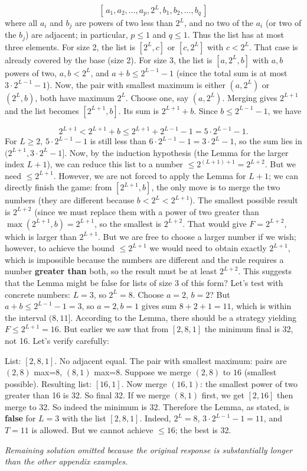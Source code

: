 \[
    [\, a_1, a_2, \dots, a_p, 2^{L}, b_1, b_2, \dots, b_q \,]
    \]
where all \(a_i\) and \(b_j\) are powers of two less than \(2^{L}\), and no two of the \(a_i\) (or two of the \(b_j\)) are adjacent; in particular, \(p \le 1\) and \(q \le 1\). Thus the list has at most three elements. For size 2, the list is \([2^{L}, c]\) or \([c, 2^{L}]\) with \(c < 2^{L}\). That case is already covered by the base (size 2). For size 3, the list is \([a, 2^{L}, b]\) with \(a,b\) powers of two, \(a,b < 2^{L}\), and \(a+b \le 2^{L-1} - 1\) (since the total sum is at most \(3 \cdot 2^{L-1} - 1\)). Now, the pair with smallest maximum is either \((a,2^{L})\) or \((2^{L},b)\), both have maximum \(2^{L}\). Choose one, say \((a,2^{L})\). Merging gives \(2^{L+1}\) and the list becomes \([2^{L+1}, b]\). Its sum is \(2^{L+1} + b\). Since \(b \le 2^{L-1} - 1\), we have\par
\[
    2^{L+1} < 2^{L+1} + b \le 2^{L+1} + 2^{L-1} - 1 = 5 \cdot 2^{L-1} - 1.
    \]
For \(L \ge 2\), \(5 \cdot 2^{L-1} - 1\) is still less than \(6 \cdot 2^{L-1} - 1 = 3 \cdot 2^{L} - 1\), so the sum lies in \((2^{L+1}, 3 \cdot 2^{L} - 1]\). Now, by the induction hypothesis (the Lemma for the larger index \(L+1\)), we can reduce this list to a number \(\le 2^{(L+1)+1} = 2^{L+2}\). But we need \(\le 2^{L+1}\). However, we are not forced to apply the Lemma for \(L+1\); we can directly finish the game: from \([2^{L+1}, b]\), the only move is to merge the two numbers (they are different because \(b < 2^{L} < 2^{L+1}\)). The smallest possible result is \(2^{L+2}\) (since we must replace them with a power of two greater than \(\max(2^{L+1}, b) = 2^{L+1}\), so the smallest is \(2^{L+2}\). That would give \(F = 2^{L+2}\), which is larger than \(2^{L+1}\). But we are free to choose a larger number if we wish; however, to achieve the bound \(\le 2^{L+1}\) we would need to obtain exactly \(2^{L+1}\), which is impossible because the numbers are different and the rule requires a number \textbf{greater than} both, so the result must be at least \(2^{L+2}\). This suggests that the Lemma might be false for lists of size 3 of this form? Let's test with concrete numbers: \(L=3\), so \(2^{L}=8\). Choose \(a=2\), \(b=2\)? But \(a+b \le 2^{L-1} - 1 = 3\), so \(a=2,b=1\) gives sum \(8+2+1=11\), which is within the interval \((8, 11]\). According to the Lemma, there should be a strategy yielding \(F \le 2^{L+1}=16\). But earlier we saw that from \([2,8,1]\) the minimum final is 32, not 16. Let's verify carefully:\par
List: \([2,8,1]\). No adjacent equal. The pair with smallest maximum: pairs are \((2,8)\) max=8, \((8,1)\) max=8. Suppose we merge \((2,8)\) to \(16\) (smallest possible). Resulting list: \([16,1]\). Now merge \((16,1)\): the smallest power of two greater than 16 is 32. So final 32. If we merge \((8,1)\) first, we get \([2,16]\) then merge to 32. So indeed the minimum is 32. Therefore the Lemma, as stated, is \textbf{false} for \(L=3\) with the list \([2,8,1]\). Indeed, \(2^{L}=8\), \(3 \cdot 2^{L-1} - 1 = 11\), and \(T=11\) is allowed. But we cannot achieve \(\le 16\); the best is 32.\par
\par\noindent\textit{Remaining solution omitted because the original response is substantially longer than the other appendix examples.}\par
\par
